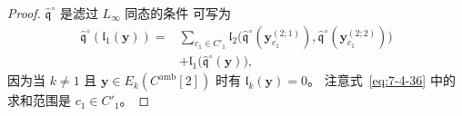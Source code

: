 \begin{proof}
$\widehat{\mathfrak q}^{\circ}$
是滤过 $L_\infty$ 同态的条件
可写为
\begin{equation}
\begin{aligned}
\widehat{\mathfrak q}^{\circ}
(\mathfrak l_1(\mathbf y))
={}&\sum_{c_1\in C'_1}
\mathfrak l_2\bigl(
\widehat{\mathfrak q}^{\circ}
(\mathbf y_{c_1}^{(2;1)}),
\widehat{\mathfrak q}^{\circ}
(\mathbf y_{c_1}^{(2;2)})\bigr)\\
&+\mathfrak l_1\bigl(
\widehat{\mathfrak q}^{\circ}
(\mathbf y)\bigr),
\end{aligned}
\tag{7.4.36}\label{eq:7-4-36}
\end{equation}
因为当 $k\ne1$ 且
$\mathbf y\in E_k(C^{\mathrm{amb}}[2])$
时有 $\mathfrak l_k(\mathbf y)=0$。
注意式~\eqref{eq:7-4-36}
中的求和范围是 $c_1\in C'_1$。


\end{proof}
